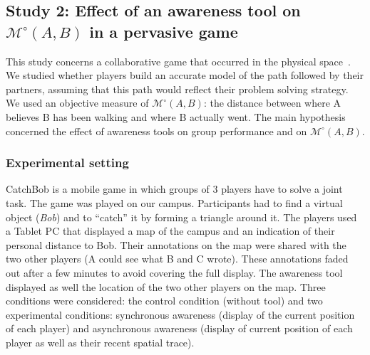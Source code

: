 \documentclass[natbib]{svjour3}
\newcommand{\A}{A\xspace}
\newcommand{\B}{B\xspace}
\newcommand{\C}{C\xspace}
\newcommand{\gModel}[2]{{$\mathcal{M}^{\circ}(#1, #2)$}}
\begin{document}


\subsection{{\bf Study 2}: Effect of an awareness tool on \gModel{A}{B}  in a pervasive
game}

This study concerns a collaborative game that occurred in the physical
space~\citep{nova2006underwhelming}. We studied whether players
build an accurate model of the path followed by their partners, assuming that this
path would reflect their problem solving strategy. We used an objective measure of
\gModel{A}{B}: the distance between where \A believes \B has been walking and
where \B actually went.  The main hypothesis concerned the effect of awareness
tools on group performance and on \gModel{A}{B}. 

\subsubsection*{Experimental setting}

{\sc CatchBob} is a mobile game in which groups of 3 players have to solve a
joint task. The game was played on our campus. Participants had to find a
virtual object (\emph{Bob}) and to ``catch'' it by forming a triangle around it.
The players used a Tablet PC that displayed a map of the campus and an indication of
their personal distance to Bob. Their annotations on the map were shared with
the two other players (\A could see what \B and \C wrote). These annotations
faded out after a few minutes to avoid covering the full display. The awareness
tool displayed as well the location of the two other players on the map. Three
conditions were considered: the control condition (without tool) and two
experimental conditions: synchronous awareness (display of the current position
of each player) and asynchronous awareness (display of current position of each
player as well as their recent spatial trace).
\end{document}
